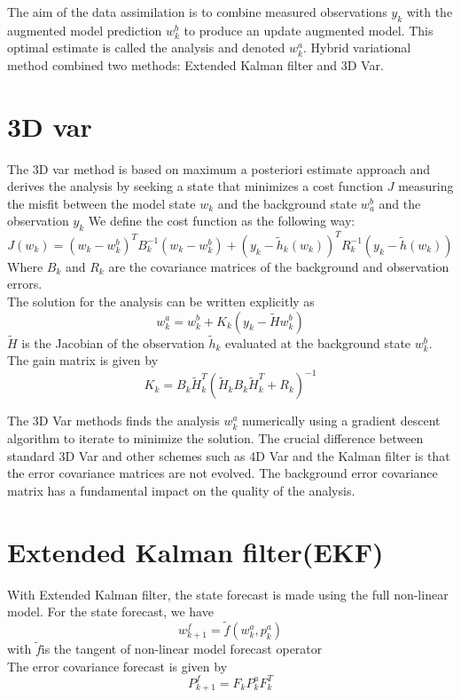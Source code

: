 \documentclass[a4,12pt]{article}
\numberwithin{equation}{section}
\begin{document}


The aim of the data assimilation is to combine measured observations $y_k$ with the augmented model prediction $w_k^b$ to produce an update augmented model. This optimal estimate is called the analysis and denoted $w_k^a$. Hybrid variational method combined two methods: Extended Kalman filter and 3D Var.

\section{3D var}
The 3D var method is based on maximum a posteriori estimate approach and derives the analysis by seeking a state that minimizes a cost function $J$ measuring the misfit between the model state $w_k$ and the background state $w_a^b$ and the observation $y_k$
We define  the cost function as the following way:
\begin{equation}
    J(w_k) = (w_k - w_k^b)^T B_k^{-1} (w_k - w_k^b) + (y_k - \tilde h_k (w_k)) ^T R_k^{-1} (y_k - \tilde h (w_k)) 
\label{costFunc}
\end{equation}
Where $B_k$ and $R_k$ are the covariance matrices of the background and observation errors. \\
The solution for the analysis can be written explicitly as 
\begin{equation}
    w_k^a = w_k^b + K_k (y_k - \tilde H w_k^b)
\label{sol3D}
\end{equation}
$\tilde H$ is the Jacobian of the observation $\tilde h_k$ evaluated at the background state $w_k^b$. \\
The gain matrix is given by
\begin{equation}
    K_k =  B_k \tilde H_k^T(  \tilde H_k B_k \tilde H_k^T + R_k)^{-1}
\label{matrixGain3D}
\end{equation}


The 3D Var methods finds the analysis $w_k^a$ numerically using a gradient descent algorithm to iterate to minimize the solution.
The crucial difference between standard 3D Var and other schemes such as 4D Var and the Kalman filter is that the error covariance matrices are not evolved. The background error covariance matrix has a fundamental impact on the quality of the analysis.
\section{Extended Kalman filter(EKF)}  
With Extended Kalman filter, the state forecast is made using the full non-linear model.
For the state forecast, we have 
\begin{equation}
w_{k+1}^f = \tilde{f} (w_k^a, p_k^a)
\label{EKFfor}
\end{equation}
with $\tilde{f} $is the tangent of non-linear model forecast operator 
~~\\
The error covariance forecast is given by 
\begin{equation}
P_{k+1}^f = F_k P_k^a F_k^T
\label{CovEKF}
\end{equation}
\end{document}
